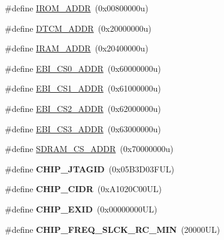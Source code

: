 \begin{DoxyCompactItemize}
\item 
\#define \mbox{\hyperlink{group__SAME70J20__definitions_ga694212ffb8c2786bacee3d0ad6020bda}{I\+R\+O\+M\+\_\+\+A\+D\+DR}}~(0x00800000u)
\item 
\#define \mbox{\hyperlink{group__SAME70J20__definitions_ga26626a425f7ebb3a0c2dbc276f0d9f78}{D\+T\+C\+M\+\_\+\+A\+D\+DR}}~(0x20000000u)
\item 
\#define \mbox{\hyperlink{group__SAME70J20__definitions_gaae45ac2ef16942159481c767ac4805cf}{I\+R\+A\+M\+\_\+\+A\+D\+DR}}~(0x20400000u)
\item 
\#define \mbox{\hyperlink{group__SAME70J20__definitions_ga9bcbb97ddae3b2cc5e2c9613d33f66b4}{E\+B\+I\+\_\+\+C\+S0\+\_\+\+A\+D\+DR}}~(0x60000000u)
\item 
\#define \mbox{\hyperlink{group__SAME70J20__definitions_gaaddd9fdbbc77c9aced5308819f502a26}{E\+B\+I\+\_\+\+C\+S1\+\_\+\+A\+D\+DR}}~(0x61000000u)
\item 
\#define \mbox{\hyperlink{group__SAME70J20__definitions_ga058a35f9991487dc2dd12ada792d0730}{E\+B\+I\+\_\+\+C\+S2\+\_\+\+A\+D\+DR}}~(0x62000000u)
\item 
\#define \mbox{\hyperlink{group__SAME70J20__definitions_gad66ebdd0fc33ec3cf85dbaa14bbf05d9}{E\+B\+I\+\_\+\+C\+S3\+\_\+\+A\+D\+DR}}~(0x63000000u)
\item 
\#define \mbox{\hyperlink{group__SAME70J20__definitions_ga61b7db25daf759c2a2beb6e5a0b57a84}{S\+D\+R\+A\+M\+\_\+\+C\+S\+\_\+\+A\+D\+DR}}~(0x70000000u)
\item 
\mbox{\label{group__SAME70J20__definitions_gaa614519778eec0df55d3eeab3223e3f6}} 
\#define {\bfseries C\+H\+I\+P\+\_\+\+J\+T\+A\+G\+ID}~(0x05\+B3\+D03\+F\+U\+L)
\item 
\mbox{\label{group__SAME70J20__definitions_ga1e1ae44dd9269a8a98c1d7e7a60e9fbd}} 
\#define {\bfseries C\+H\+I\+P\+\_\+\+C\+I\+DR}~(0x\+A1020\+C00\+U\+L)
\item 
\mbox{\label{group__SAME70J20__definitions_ga35123717aa86b76bb6b73cf3adc4c2e6}} 
\#define {\bfseries C\+H\+I\+P\+\_\+\+E\+X\+ID}~(0x00000000\+U\+L)
\item 
\mbox{\label{group__SAME70J20__definitions_ga0e868bf27426399dfdcb3a9dfc3733c4}} 
\#define {\bfseries C\+H\+I\+P\+\_\+\+F\+R\+E\+Q\+\_\+\+S\+L\+C\+K\+\_\+\+R\+C\+\_\+\+M\+IN}~(20000\+U\+L)

\end{DoxyCompactItemize}
